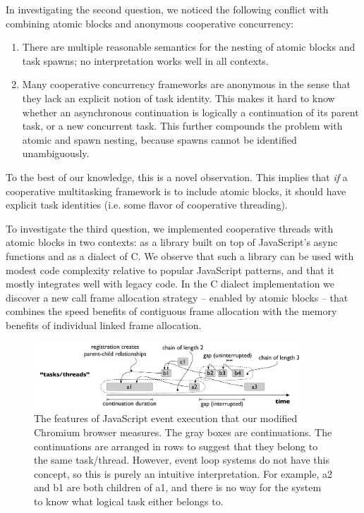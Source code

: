 \documentclass[acmsmall,anonymous,review]{acmart}\settopmatter{printfolios=true,printccs=false,printacmref=false}
\begin{document}
In investigating the second question, we noticed the following conflict with combining atomic blocks and anonymous cooperative concurrency:
\begin{enumerate}
\item There are multiple reasonable semantics for the nesting of atomic blocks and task spawns; no interpretation works well in all contexts.
\item Many cooperative concurrency frameworks are anonymous in the sense that they lack an explicit notion of task identity.
  This makes it hard to know whether an asynchronous continuation is logically a continuation of its parent task, or a new concurrent task.
  This further compounds the problem with atomic and spawn nesting, because spawns cannot be identified unambiguously.
\end{enumerate}
To the best of our knowledge, this is a novel observation.
This implies that \emph{if} a cooperative multitasking framework is to include atomic blocks, it should have explicit task identities (i.e. some flavor of cooperative threading).

To investigate the third question, we implemented cooperative threads with atomic blocks in two contexts: as a library built on top of JavaScript's async functions and as a dialect of C.
We observe that such a library can be used with modest code complexity relative to popular JavaScript patterns, and that it mostly integrates well with legacy code.
In the C dialect implementation we discover a new call frame allocation strategy -- enabled by atomic blocks -- that combines the speed benefits of contiguous frame allocation with the memory benefits of individual linked frame allocation.

\begin{figure}
\includegraphics[width=0.9\textwidth]{Figures/continuation_tree}
\caption{The features of JavaScript event execution that our modified Chromium browser measures.
  The gray boxes are continuations.
  The continuations are arranged in rows to suggest that they belong to the same task/thread.
  However, event loop systems do not have this concept, so this is purely an intuitive interpretation.
  For example, a2 and b1 are both children of a1, and there is no way for the system to know what logical task either belongs to.}
\label{fig:continuation_tree}
\end{figure}
\end{document}

